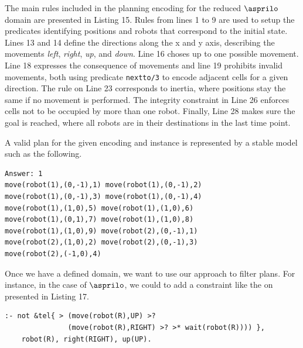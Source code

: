 The main rules included in the planning encoding for the reduced $\asprilo$ domain are presented in Listing 15. 
Rules from lines 1 to 9 are used to setup the predicates identifying positions and robots that correspond to the initial state. 
Lines 13 and 14 define the directions along the x and y axis, describing the movements \textit{left}, \textit{right}, \textit{up}, and \textit{down}.
Line 16 choses up to one possible movement. Line 18 expresses the consequence of movements and line 19 prohibits invalid movements, both using predicate \texttt{nextto/3} to encode adjacent cells for a given direction. The rule on Line 23 corresponds to inertia, where positions stay the same if no movement is performed. The integrity constraint in Line 26 enforces cells not to be occupied by more than one robot. Finally, Line 28 makes sure the goal is reached, where all robots are in their destinations in the last time point.

A valid plan for the given encoding and instance is represented by a stable model such as the following.

\begin{center}
    \begin{lstlisting}[numbers=none, frame=none]
Answer: 1
move(robot(1),(0,-1),1) move(robot(1),(0,-1),2)
move(robot(1),(0,-1),3) move(robot(1),(0,-1),4)
move(robot(1),(1,0),5) move(robot(1),(1,0),6) 
move(robot(1),(0,1),7) move(robot(1),(1,0),8) 
move(robot(1),(1,0),9) move(robot(2),(0,-1),1)
move(robot(2),(1,0),2) move(robot(2),(0,-1),3)
move(robot(2),(-1,0),4)
    \end{lstlisting}
\end{center}


Once we have a defined domain, we want to use our approach to filter plans. For instance, in the case of $\asprilo$, we could to add a constraint like the on presented in Listing 17.  


\begin{center}
    \begin{lstlisting}[] 
:- not &tel{ > (move(robot(R),UP) >? 
               (move(robot(R),RIGHT) >? >* wait(robot(R)))) },
    robot(R), right(RIGHT), up(UP).
    \end{lstlisting}
\end{center}

